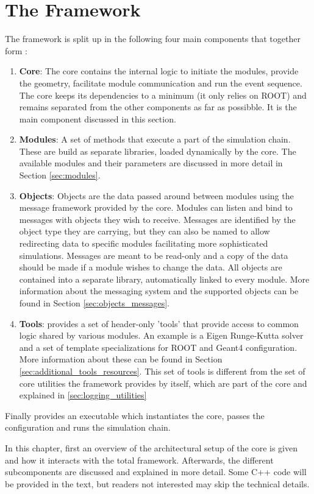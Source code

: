 \section{The \apsq Framework}
\label{sec:framework}
The framework is split up in the following four main components that together form \apsq:
\begin{enumerate}
\item \textbf{Core}: The core contains the internal logic to initiate the modules, provide the geometry, facilitate module communication and run the event sequence. The core keeps its dependencies to a minimum (it only relies on ROOT) and remains separated from the other components as far as possibble. It is the main component discussed in this section.
\item \textbf{Modules}: A set of methods that execute a part of the simulation chain. These are build as separate libraries, loaded dynamically by the core. The available modules and their parameters are discussed in more detail in Section \ref{sec:modules}.
\item \textbf{Objects}: Objects are the data passed around between modules using the message framework provided by the core. Modules can listen and bind to messages with objects they wish to receive. Messages are identified by the object type they are carrying, but they can also be named to allow redirecting data to specific modules facilitating more sophisticated simulations. Messages are meant to be read-only and a copy of the data should be made if a module wishes to change the data. All objects are contained into a separate library, automatically linked to every module. More information about the messaging system and the supported objects can be found in Section \ref{sec:objects_messages}.
\item \textbf{Tools}: \apsq provides a set of header-only 'tools' that provide access to common logic shared by various modules. An example is a Eigen Runge-Kutta solver and a set of template specializations for ROOT and Geant4 configuration. More information about these can be found in Section \ref{sec:additional_tools_resources}. This set of tools is different from the set of core utilities the framework provides by itself, which are part of the core and explained in \ref{sec:logging_utilities}
\end{enumerate}
Finally \apsq provides an executable which instantiates the core, passes the configuration and runs the simulation chain.

In this chapter, first an overview of the architectural setup of the core is given and how it interacts with the total \apsq framework. Afterwards, the different subcomponents are discussed and explained in more detail. Some C++ code will be provided in the text, but readers not interested may skip the technical details.

